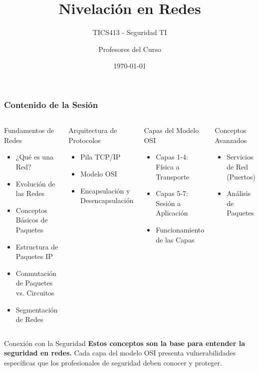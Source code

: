 \documentclass[aspectratio=169]{beamer}
\title{\footnotesize \textbf{Nivelación en Redes}}
\subtitle{\footnotesize TICS413 - Seguridad TI}
\author{\footnotesize Profesores del Curso}
\institute{\footnotesize UAI}
\date{\footnotesize \today}
\begin{document}
\begin{frame}
\maketitle
\end{frame}

\begin{frame}
\frametitle{Contenido de la Sesión}
\begin{columns}
\begin{block}{Fundamentos de Redes}
\begin{itemize}
\item ¿Qué es una Red?
\item Evolución de las Redes
\item Conceptos Básicos de Paquetes
\item Estructura de Paquetes IP
\item Conmutación de Paquetes vs. Circuitos
\item Segmentación de Redes
\end{itemize}
\end{block}

\begin{block}{Arquitectura de Protocolos}
\begin{itemize}
\item Pila TCP/IP
\item Modelo OSI
\item Encapsulación y Desencapsulación
\end{itemize}
\end{block}

\begin{block}{Capas del Modelo OSI}
\begin{itemize}
\item Capas 1-4: Física a Transporte
\item Capas 5-7: Sesión a Aplicación
\item Funcionamiento de las Capas
\end{itemize}
\end{block}

\begin{block}{Conceptos Avanzados}
\begin{itemize}
\item Servicios de Red (Puertos)
\item Análisis de Paquetes
\end{itemize}
\end{block}
\end{columns}

\begin{block}{Conexión con la Seguridad}
\textbf{Estos conceptos son la base para entender la seguridad en redes.} 
Cada capa del modelo OSI presenta vulnerabilidades específicas que los 
profesionales de seguridad deben conocer y proteger.
\end{block}
\end{frame}
\end{document}
